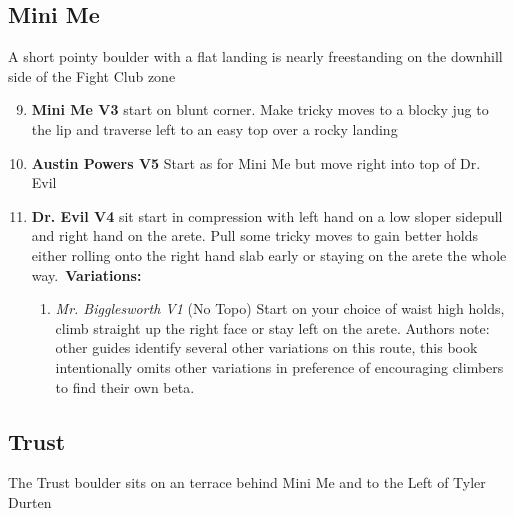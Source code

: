 \subsection*{Mini Me}\label{bf:Mini Me}
A short pointy boulder with a flat landing is nearly freestanding on the downhill side of the Fight Club zone

\begin{enumerate}[]
	\setcounter{enumi}{8}
	\item\label{rt:Mini Me} \colorbox{green!20}{\textbf{Mini Me V3  } }
	\newline start on blunt corner. Make tricky moves to a blocky jug to the lip and traverse left to an easy top over a rocky landing\
	\setcounter{enumi}{9}
	\item\label{rt:Austin Powers} \colorbox{RoyalBlue!20}{\textbf{Austin Powers V5    } }
	\newline Start as for Mini Me but move right into top of Dr. Evil\
	\setcounter{enumi}{10}
	\item\label{rt:Dr. Evil} \colorbox{RoyalBlue!20}{\textbf{Dr. Evil V4    } }
	\newline sit start in compression with left hand on a low sloper sidepull and right hand on the arete. Pull some tricky moves to gain better holds either rolling onto the right hand slab early or staying on the arete the whole way.\
	\newline \textbf{Variations:}
	\begin{enumerate}
		\item\label{vr:Mr. Bigglesworth} \colorbox{green!20}{\emph{Mr. Bigglesworth V1 \ding{72} \ding{72}  }  }
		\newline (No Topo) 
		\newline Start on your choice of waist high holds, climb straight up the right face or stay left on the arete. Authors note: other guides identify several other variations on this route, this book intentionally omits other variations in preference of encouraging climbers to find their own beta.\
	\end{enumerate}
\end{enumerate}
\subsection*{Trust}\label{bf:Trust}
The Trust boulder sits on an terrace behind Mini Me and to the Left of Tyler Durten


